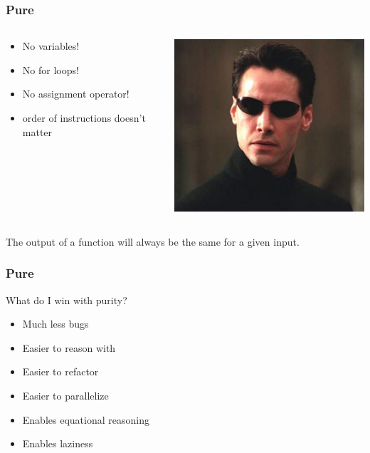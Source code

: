 \documentclass{beamer}
\begin{document}
\begin{frame}
\frametitle{Pure}

 \begin{columns}[]
  \begin{column}[]{5cm}
   \begin{itemize}
    \item No variables!
    \item No for loops!
    \item No assignment operator!
    \item order of instructions doesn't matter
   \end{itemize}
  \end{column}
  \begin{column}[]{5cm}
    \includegraphics[width=0.5\linewidth]{figs/neo}
  \end{column}
 \end{columns}

 The output of a function will always be the same for a given input.
 
\end{frame}

\begin{frame}
\frametitle{Pure}

What do I win with purity?
 \begin{itemize}
  \item Much less bugs
  \item Easier to reason with
  \item Easier to refactor
  \item Easier to parallelize
  \item Enables equational reasoning
  \item Enables laziness
 \end{itemize}

 
\end{frame}
\end{document}
